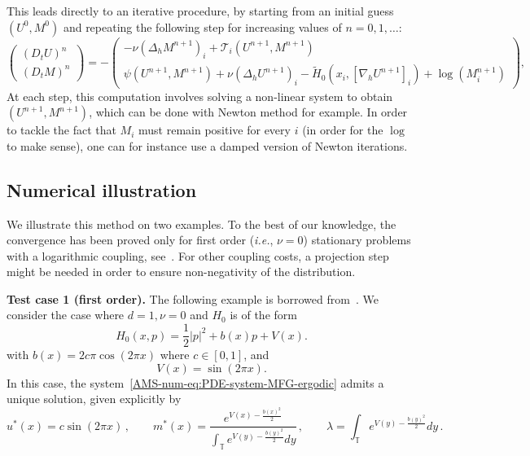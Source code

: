 \documentclass{amsproc}
\theoremstyle{definition}
\theoremstyle{remark}
\numberwithin{equation}{section}
\newcommand{\TT}{{\mathbb T}}
\newcommand{\grad}{\nabla}
\begin{document}
This leads directly to an iterative procedure, by starting from an initial guess $(U^0, M^0)$ and repeating the following step for increasing values of $n=0,1,\dots$:
\begin{equation}
\label{AMS-num-eq:monotoneop-discrete-flow}
	\begin{pmatrix}
	(D_t U)^n
	\\
	(D_t M)^n
	\end{pmatrix} 
	=
	- \begin{pmatrix}
	 -\nu (\Delta_h M^{n+1})_{i}
	+ \mathcal{T}_i(U^{n+1}, M^{n+1})
	\\
	\psi(U^{n+1}, M^{n+1}) + \nu (\Delta_h U^{n+1})_{i}
	- \tilde{H}_0(x_i, [\grad_h U^{n+1}]_i) 
	+ \log(M^{n+1}_i)
	\end{pmatrix},
\end{equation}
At each step, this computation involves solving a non-linear system to obtain $(U^{n+1}, M^{n+1})$, which can be done with Newton method for example. In order to tackle the fact that $M_i$ must remain positive for every $i$ (in order for the $\log$ to make sense), one can for instance use a damped version of Newton iterations. 


\subsection{Numerical illustration}

 We illustrate this method on two examples. To the best of our knowledge, the convergence has been proved only for first order (\textit{i.e.}, $\nu=0$) stationary problems with a logarithmic coupling, see~\cite{MR3698446}. For other coupling costs, a projection step might be needed in order to ensure non-negativity of the distribution.



\textbf{Test case 1 (first order).} The following example is borrowed from~\cite{MR3698446}. We consider the case where $d=1, \nu = 0$ and $H_0$ is of the form
$$
	H_0(x,p) = \frac{1}{2} |p|^2 + b(x) p + V(x).
$$
with $b(x) = 2 c \pi \cos(2 \pi x)$ where $c \in [0,1]$, and 
$$
	V(x) = \sin(2 \pi x).
$$
In this case, the system~\eqref{AMS-num-eq:PDE-system-MFG-ergodic} admits a unique solution, given explicitly by
$$
	u^*(x) = c \sin(2 \pi x) \, , 
	\qquad
	m^*(x) = \frac{e^{V(x) - \frac{b(x)^2}{2}}}{ \int_{\TT} e^{V(y) - \frac{b(y)^2}{2}} dy } \,, 
	\qquad 
	\lambda =  \int_{\TT} e^{V(y) - \frac{b(y)^2}{2}} dy \,.
$$
\end{document}
